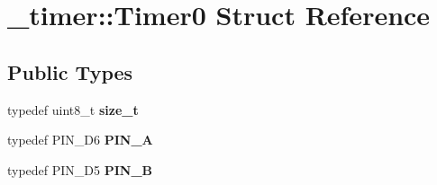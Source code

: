 \hypertarget{struct__timer_1_1Timer0}{}\section{\+\_\+timer\+:\+:Timer0 Struct Reference}
\label{struct__timer_1_1Timer0}
\subsection*{Public Types}
\begin{DoxyCompactItemize}
\item 
typedef uint8\+\_\+t {\bfseries size\+\_\+t}\hypertarget{struct__timer_1_1Timer0_ae657967e46144d5bd2581d9551ee58d9}{}\label{struct__timer_1_1Timer0_ae657967e46144d5bd2581d9551ee58d9}

\item 
typedef P\+I\+N\+\_\+\+D6 {\bfseries P\+I\+N\+\_\+A}\hypertarget{struct__timer_1_1Timer0_a29d1da3676a5022eae7322a5d92e5549}{}\label{struct__timer_1_1Timer0_a29d1da3676a5022eae7322a5d92e5549}

\item 
typedef P\+I\+N\+\_\+\+D5 {\bfseries P\+I\+N\+\_\+B}\hypertarget{struct__timer_1_1Timer0_afff9d9d179772b8a79508e46580f0cf0}{}\label{struct__timer_1_1Timer0_afff9d9d179772b8a79508e46580f0cf0}

\end{DoxyCompactItemize}
